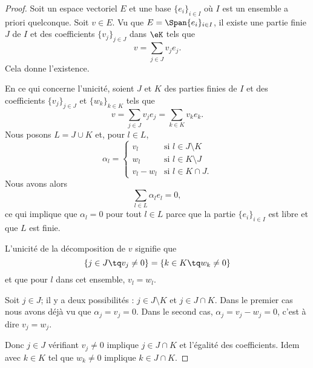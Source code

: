\begin{proof}
    Soit un espace vectoriel \( E\) et une base \( \{ e_i \}_{i\in I}\) où \( I\) est un ensemble a priori quelconque. Soit \( v\in E\). Vu que \( E=\Span\{ e_i \}_{i\in I}\), il existe une partie finie \( J\) de \( I\) et des coefficients \( \{ v_j \}_{j\in J}\) dans \( \eK\) tels que
    \begin{equation}
        v=\sum_{j\in J}v_je_j.
    \end{equation}
    Cela donne l'existence.

    En ce qui concerne l'unicité, soient \( J \) et \( K\) des parties finies de \( I\) et des coefficients \( \{ v_j \}_{j\in J}\) et \( \{ w_{k} \}_{k\in K}\) tels que
    \begin{equation}
        v=\sum_{j\in J}v_je_j=\sum_{k\in K}v_{k}e_{k}.
    \end{equation}
    Nous posons \( L=J\cup K\) et, pour \( l\in L\),
    \begin{equation}
        \alpha_l=\begin{cases}
            v_l    &   \text{si } l\in J\setminus K\\
            w_l    &    \text{si } l\in K\setminus J\\
            v_l-w_l    &    \text{si } l\in K\cap J.
        \end{cases}
    \end{equation}
    Nous avons alors
    \begin{equation}
        \sum_{l\in L}\alpha_le_l=0,
    \end{equation}
    ce qui implique que \( \alpha_l=0\) pour tout \( l\in L\) parce que la partie \( \{ e_i \}_{i\in I}\) est libre et que \( L\) est finie.

    L'unicité de la décomposition de \( v\) signifie que
    \begin{equation}
        \{ j\in J \tq v_j\neq 0 \}=\{ k\in K\tq w_k\neq 0 \}
    \end{equation}
    et que pour \( l\) dans cet ensemble, \( v_l=w_l\).

    Soit \( j\in J\); il y a deux possibilités : \( j\in J\setminus K\) et \( j\in J\cap K\). Dans le premier cas nous avons déjà vu que \( \alpha_j=v_j=0\). Dans le second cas, \( \alpha_j=v_j-w_j=0\), c'est à dire \( v_j=w_j\).

    Donc \( j\in J\) vérifiant \( v_j\neq 0\) implique \( j\in J\cap K\) et l'égalité des coefficients. Idem avec \( k\in K\) tel que \( w_k\neq 0\) implique \( k\in J\cap K\).
\end{proof}


